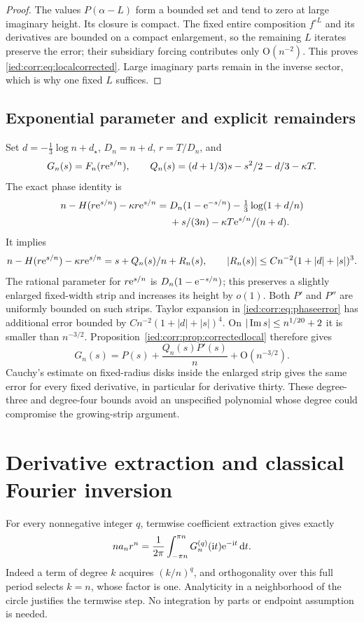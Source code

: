 \documentclass[11pt,letterpaper]{article}
\theoremstyle{remark}\newtheorem{remark}[theorem]{Remark}
\newcommand{\ii}{\mathrm i}\newcommand{\dd}{\,\mathrm d}
\newcommand{\Oh}{\mathrm O}\newcommand{\supp}{\operatorname{supp}}
\begin{document}
\begin{proof}
The values $P(\alpha-L)$ form a bounded set and tend to zero at large imaginary height. Its closure is compact. The fixed entire composition $f^{\circ L}$ and its derivatives are bounded on a compact enlargement, so the remaining $L$ iterates preserve the error; their subsidiary forcing contributes only $\Oh(n^{-2})$. This proves \eqref{ied:corr:eq:localcorrected}. Large imaginary parts remain in the inverse sector, which is why one fixed $L$ suffices.
\end{proof}

\subsection{Exponential parameter and explicit remainders}
Set $d=-\frac13\log n+d_\star$, $D_n=n+d$, $r=T/D_n$, and
\[
 G_n(s)=F_n(r\mathrm e^{s/n}),\qquad
 Q_n(s)=(d+1/3)s-s^2/2-d/3-\kappa T.
\]
The exact phase identity is
\begin{align}\label{ied:corr:eq:phaseexact}
 n-H(r\mathrm e^{s/n})-\kappa r\mathrm e^{s/n}
 ={}&D_n(1-\mathrm e^{-s/n})-\tfrac13\log(1+d/n)\notag\\
    &+s/(3n)-\kappa T\mathrm e^{s/n}/(n+d).
\end{align}
It implies
\begin{equation}\label{ied:corr:eq:phaseerror}
 n-H(r\mathrm e^{s/n})-\kappa r\mathrm e^{s/n}
 =s+Q_n(s)/n+R_n(s),\qquad
 |R_n(s)|\le Cn^{-2}(1+|d|+|s|)^3.
\end{equation}
The rational parameter for $r\mathrm e^{s/n}$ is $D_n(1-\mathrm e^{-s/n})$; this preserves a slightly enlarged fixed-width strip and increases its height by $o(1)$. Both $P'$ and $P''$ are uniformly bounded on such strips. Taylor expansion in \eqref{ied:corr:eq:phaseerror} has additional error bounded by
$Cn^{-2}(1+|d|+|s|)^4$. On $|\operatorname{Im} s|\le n^{1/20}+2$ it is smaller than $n^{-3/2}$. Proposition~\ref{ied:corr:prop:correctedlocal} therefore gives
\begin{equation}\label{ied:corr:eq:Gexpand}
 G_n(s)=P(s)+\frac{Q_n(s)P'(s)}n+\Oh(n^{-3/2}).
\end{equation}
Cauchy's estimate on fixed-radius disks inside the enlarged strip gives the same error for every fixed derivative, in particular for derivative thirty. These degree-three and degree-four bounds avoid an unspecified polynomial whose degree could compromise the growing-strip argument.

\section{Derivative extraction and classical Fourier inversion}\label{ied:corr:sec:extract}
For every nonnegative integer $q$, termwise coefficient extraction gives exactly
\begin{equation}\label{ied:corr:eq:extract}
 n a_n r^n=\frac1{2\pi}\int_{-\pi n}^{\pi n}
                  G_n^{(q)}(\ii t)\e^{-\ii t}\dd t.
\end{equation}
Indeed a term of degree $k$ acquires $(k/n)^q$, and orthogonality over this full period selects $k=n$, whose factor is one. Analyticity in a neighborhood of the circle justifies the termwise step. No integration by parts or endpoint assumption is needed.
\end{document}
